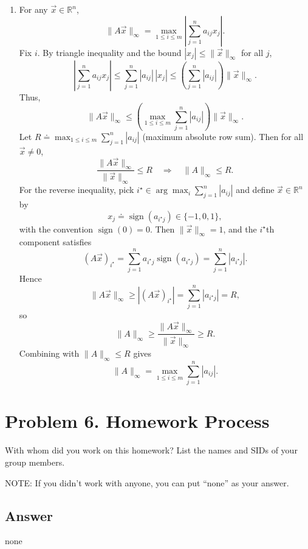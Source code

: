 \documentclass[
  12pt,
]{fphw}
\begin{document}
\begin{enumerate}
\item[(c)] For any $\vec x\in\mathbb{R}^n$,
\[
\|A\vec x\|_\infty
= \max_{1\le i\le m}\left|\sum_{j=1}^n a_{ij}x_j\right|.
\]
Fix $i$. By triangle inequality and the bound $|x_j|\le \|\vec x\|_\infty$ for all $j$,
\[
\left|\sum_{j=1}^n a_{ij}x_j\right|
\le \sum_{j=1}^n |a_{ij}|\,|x_j|
\le \left(\sum_{j=1}^n |a_{ij}|\right)\|\vec x\|_\infty.
\]
Thus,
\[
\|A\vec x\|_\infty
\le \left(\max_{1\le i\le m}\sum_{j=1}^n |a_{ij}|\right)\|\vec x\|_\infty.
\]
Let $R \doteq \max_{1\le i\le m}\sum_{j=1}^n |a_{ij}|$ (maximum absolute row sum). Then for all $\vec x\neq 0$,
\[
\frac{\|A\vec x\|_\infty}{\|\vec x\|_\infty} \le R
\quad\Longrightarrow\quad
\|A\|_\infty \le R.
\]
For the reverse inequality, pick $i^\star\in\arg\max_i \sum_{j=1}^n |a_{ij}|$ and define $\vec x\in\mathbb{R}^n$ by
\[
x_j \doteq \operatorname{sign}(a_{i^\star j}) \in \{-1,0,1\},
\]
with the convention $\operatorname{sign}(0)=0$. Then $\|\vec x\|_\infty = 1$, and the $i^\star$th component satisfies
\[
(A\vec x)_{i^\star} = \sum_{j=1}^n a_{i^\star j} \operatorname{sign}(a_{i^\star j})
= \sum_{j=1}^n |a_{i^\star j}|.
\]
Hence
\[
\|A\vec x\|_\infty \ge |(A\vec x)_{i^\star}| = \sum_{j=1}^n |a_{i^\star j}| = R,
\]
so
\[
\|A\|_\infty \ge \frac{\|A\vec x\|_\infty}{\|\vec x\|_\infty} \ge R.
\]
Combining with $\|A\|_\infty \le R$ gives
\[
\|A\|_\infty = \max_{1\le i\le m}\sum_{j=1}^n |a_{ij}|.
\]
\end{enumerate}

\newpage
\section*{Problem 6. Homework Process}

With whom did you work on this homework? List the names and SIDs of your group members.

NOTE: If you didn’t work with anyone, you can put “none” as your answer.


\subsection*{Answer}
none

\end{document}
